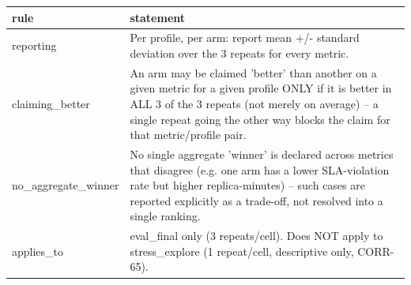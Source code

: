\begin{tabular}{ll}
\hline
rule & statement \\
\hline
reporting & Per profile, per arm: report mean +/- standard deviation over the 3 repeats for every metric. \\
claiming\_better & An arm may be claimed 'better' than another on a given metric for a given profile ONLY if it is better in ALL 3 of the 3 repeats (not merely on average) -- a single repeat going the other way blocks the claim for that metric/profile pair. \\
no\_aggregate\_winner & No single aggregate 'winner' is declared across metrics that disagree (e.g. one arm has a lower SLA-violation rate but higher replica-minutes) -- such cases are reported explicitly as a trade-off, not resolved into a single ranking. \\
applies\_to & eval\_final only (3 repeats/cell). Does NOT apply to stress\_explore (1 repeat/cell, descriptive only, CORR-65). \\
\hline
\end{tabular}
